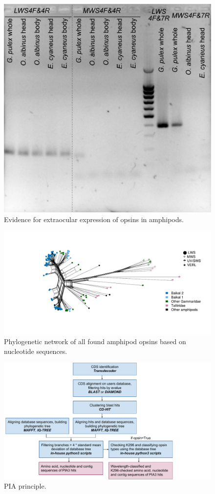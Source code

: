 \documentclass{article}
\begin{document}
\begin{figure}[H] 
	\includegraphics[scale=0.65]{./FigS4_cDNA_diff_body_parts.png}
	\caption{Evidence for extraocular expression of opsins in amphipods.} \end{figure}

\begin{figure}[H] 
	\includegraphics[width=\linewidth]{./FigS5_all_opsins_network.pdf}
	\caption{Phylogenetic network of all found amphipod opsins based on nucleotide sequences.} \end{figure}

\begin{figure}[H] 
	\includegraphics[width=\linewidth]{./FigS6_PIA3.pdf}
	\caption{PIA principle.} \end{figure}

	

	
\end{document}
